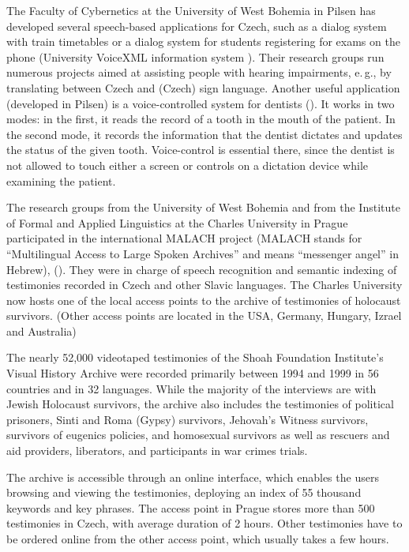 \begin{multicols}{2}
The Faculty of Cybernetics at the University of West Bohemia in Pilsen has developed several speech-based applications for Czech, such as a dialog system with train timetables or a dialog system for students registering for exams on the phone (University VoiceXML information system \cite{Note24}). Their research groups run numerous projects aimed at assisting people with hearing impairments, e.\,g., by translating between Czech and (Czech) sign language.
Another useful application (developed in Pilsen) is a voice-controlled system for dentists (\cite{Nagy2008}). It works in two modes:  in the first, it reads the record of a tooth in the mouth of the patient. In the second mode, it records the information that the dentist dictates and updates the status of the given tooth. Voice-control is essential there, since the dentist is not allowed to touch either a screen or controls on a dictation device while examining the patient.

The research groups from the University of West Bohemia and from the Institute of Formal and Applied Linguistics at the Charles University in Prague participated in the international MALACH project (MALACH stands for “Multilingual Access to Large Spoken Archives” and means “messenger angel” in Hebrew), (\cite{Psutka2005}). They were in charge of speech recognition and semantic indexing of testimonies recorded in Czech and other Slavic languages. The Charles University now hosts one of the local access points to the archive of testimonies of holocaust survivors. (Other access points are located in the USA, Germany, Hungary, Izrael and Australia)

The nearly 52,000 videotaped testimonies of the Shoah Foundation Institute's Visual History Archive were recorded primarily between 1994 and 1999 in 56 countries and in 32 languages. While the majority of the interviews are with Jewish Holocaust survivors, the archive also includes the testimonies of political prisoners, Sinti and Roma (Gypsy) survivors, Jehovah's Witness survivors, survivors of eugenics policies, and homosexual survivors as well as rescuers and aid providers, liberators, and participants in war crimes trials.

The archive is accessible through an online interface, which enables the users browsing and viewing the testimonies, deploying an index of 55 thousand keywords and key phrases. The access point in Prague stores more than 500 testimonies in Czech, with average duration of 2 hours. Other testimonies have to be ordered online from the other access point, which usually takes a few hours.


\end{multicols}
